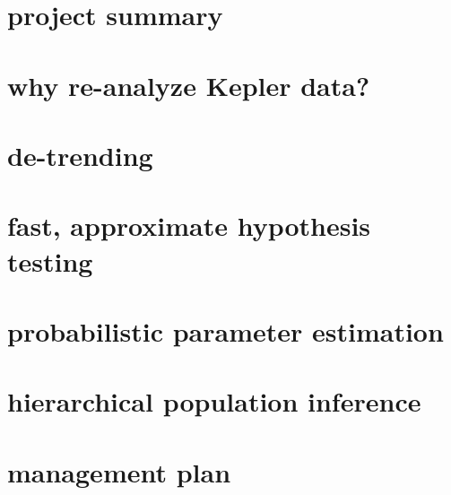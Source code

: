 \documentclass[letterpaper,12pt]{article}
\begin{document}
\section*{project summary}

\section{why re-analyze Kepler data?}

\section{de-trending}

\section{fast, approximate hypothesis testing}

\section{probabilistic parameter estimation}

\section{hierarchical population inference}

\section{management plan}
\end{document}
